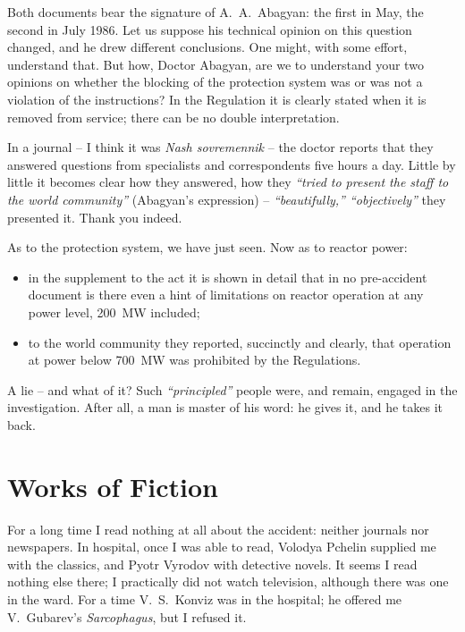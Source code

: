 \documentclass[openright]{bookest}
\begin{document}
Both documents bear the signature of A.~A.~Abagyan: the first in May, the second in July 1986. Let us suppose his technical opinion on this question changed, and he drew different conclusions. One might, with some effort, understand that. But how, Doctor Abagyan, are we to understand your two opinions on whether the blocking of the protection system was or was not a violation of the instructions? In the Regulation it is clearly stated when it is removed from service; there can be no double interpretation.

In a journal -- I think it was \textit{Nash sovremennik} -- the doctor reports that they answered questions from specialists and correspondents five hours a day. Little by little it becomes clear how they answered, how they \textit{``tried to present the staff to the world community''} (Abagyan's expression) -- \textit{``beautifully,'' ``objectively''} they presented it. Thank you indeed.

As to the protection system, we have just seen. Now as to reactor power:

\begin{itemize}
\item in the supplement to the act it is shown in detail that in no pre-accident document is there even a hint of limitations on reactor operation at any power level, \qty{200}{\mega\watt} included;
\item to the world community they reported, succinctly and clearly, that operation at power below \qty{700}{\mega\watt} was prohibited by the Regulations.
\end{itemize}

A lie -- and what of it? Such \textit{``principled''} people were, and remain, engaged in the investigation. After all, a man is master of his word: he gives it, and he takes it back.

\chapter{Works of Fiction}

For a long time I read nothing at all about the accident: neither journals nor newspapers. In hospital, once I was able to read, Volodya Pchelin supplied me with the classics, and Pyotr Vyrodov with detective novels. It seems I read nothing else there; I practically did not watch television, although there was one in the ward. For a time V.~S.~Konviz was in the hospital; he offered me V.~Gubarev's \textit{Sarcophagus}, but I refused it.
\end{document}
